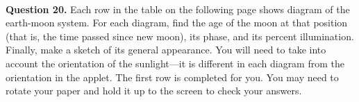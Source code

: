 \documentclass[11pt]{article}
\begin{document}
\vspace*{4cm}
\hrulefill\\

\textbf{Question 20.}
Each row in the table on the following page shows diagram of the earth-moon system. For each diagram, find the age of the moon at that position (that is, the time passed since new moon), its phase, and its percent illumination. Finally, make a sketch of its general appearance. You will need to take into account the orientation of the sunlight---it is different in each diagram from the orientation in the applet. The first row is completed for you. You may need to rotate your paper and hold it up to the screen to check your answers.  
\newpage


\end{document}
